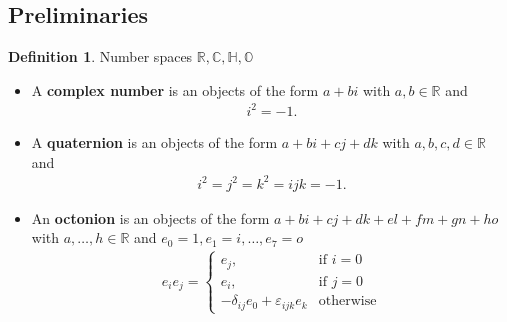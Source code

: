 \documentclass[10pt,a4paper]{book}
\theoremstyle{definition}
\newtheorem{definition}{Definition}[section]
\begin{document}
\subsection{Preliminaries}
\begin{definition}{}
Number spaces $\mathbb{R,C,H,O}$
\begin{itemize}
    \item A {\bf complex number} is an objects of the form $a+bi$ with $a,b\in\mathbb{R}$ and 
    \begin{align}
        i^2=-1.
    \end{align}
    \item A {\bf quaternion} is an objects of the form $a+bi+cj+dk$ with $a,b,c,d\in\mathbb{R}$ and 
    \begin{align}
        i^2=j^2=k^2=ijk=-1.
    \end{align}
    
    \begin{center}
\end{center}
    
    \item An {\bf octonion} is an objects of the form $a+bi+cj+dk+el+fm+gn+ho$ with $a,\dots,h\in\mathbb{R}$ and $e_0=1, e_1=i, \dots, e_7=o$
    \begin{align}
        e_ie_j=\left\{\begin{array}{ll}
                e_j, & \text{if }i=0  \\
                e_i, & \text{if }j=0  \\
                -\delta_{ij}e_0 + \varepsilon_{ijk}e_k & \text{otherwise}
                \end{array}
                \right.
    \end{align}
\end{itemize}
\end{definition}
\end{document}
